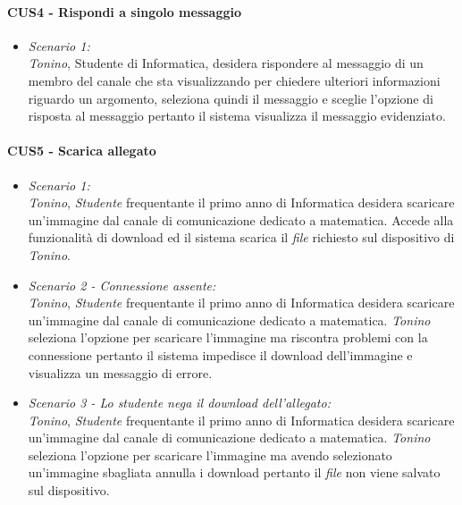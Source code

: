 \paragraph{CUS4 - Rispondi a singolo messaggio\\}
\begin{itemize}
\item \textit{Scenario 1:\\}
\textit{Tonino}, Studente di Informatica, desidera rispondere al messaggio di un membro del canale che sta visualizzando per chiedere ulteriori informazioni riguardo un argomento, seleziona quindi il messaggio e sceglie l’opzione di risposta al messaggio pertanto il sistema visualizza il messaggio evidenziato.
\end{itemize}

\paragraph{CUS5 - Scarica  allegato\\}
\begin{itemize}
\item \textit{Scenario 1:\\}
\textit{Tonino}, \textit{Studente} frequentante il primo anno di Informatica desidera scaricare un’immagine dal canale di comunicazione dedicato a matematica. Accede alla funzionalità di download ed il sistema scarica il \textit{file} richiesto sul dispositivo di \textit{Tonino}.\\

\item \textit{Scenario 2 - Connessione assente:\\}
\textit{Tonino}, \textit{Studente} frequentante il primo anno di Informatica desidera scaricare un’immagine dal canale di comunicazione dedicato a matematica. \textit{Tonino} seleziona l’opzione per scaricare l’immagine ma riscontra problemi con la connessione pertanto il sistema impedisce il download dell’immagine e visualizza un messaggio di errore.\\

\item \textit{Scenario 3 - Lo studente nega il download dell'allegato:\\}
\textit{Tonino}, \textit{Studente} frequentante il primo anno di Informatica desidera scaricare un’immagine dal canale di comunicazione dedicato a matematica. \textit{Tonino} seleziona l’opzione per scaricare l’immagine ma avendo selezionato un’immagine sbagliata annulla i download pertanto il \textit{file} non viene salvato sul dispositivo.\\
\end{itemize}

